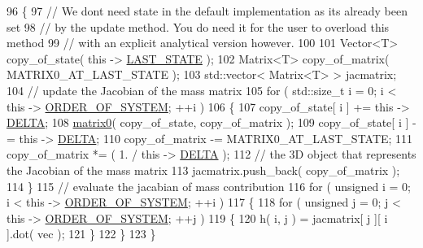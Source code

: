 \begin{DoxyCode}
96  \{
97    \textcolor{comment}{// We dont need state in the default implementation as its already been set}
98    \textcolor{comment}{// by the update method. You do need it for the user to overload this method}
99    \textcolor{comment}{// with an explicit analytical version however.}
100 
101    Vector<T> copy\_of\_state( \textcolor{keyword}{this} -> \hyperlink{classLuna_1_1Residual_abcfc99f00aa4cf3616b32dfd5315dece}{LAST\_STATE} );
102    Matrix<T> copy\_of\_matrix( MATRIX0\_AT\_LAST\_STATE );
103    std::vector< Matrix<T> > jacmatrix;
104    \textcolor{comment}{// update the Jacobian of the mass matrix}
105    \textcolor{keywordflow}{for} ( std::size\_t i = 0; i < \textcolor{keyword}{this} -> \hyperlink{classLuna_1_1Residual_a7facf1267eb277d84aeea8beba2cb200}{ORDER\_OF\_SYSTEM}; ++i )
106    \{
107      copy\_of\_state[ i ] += \textcolor{keyword}{this} -> \hyperlink{classLuna_1_1Residual_a1bf38ddfa149797de560dcb11c975fef}{DELTA};
108      \hyperlink{classLuna_1_1Equation__1matrix_a7e0adf303491e67602d5e34ab7ec3ada}{matrix0}( copy\_of\_state, copy\_of\_matrix );
109      copy\_of\_state[ i ] -= \textcolor{keyword}{this} -> \hyperlink{classLuna_1_1Residual_a1bf38ddfa149797de560dcb11c975fef}{DELTA};
110      copy\_of\_matrix -= MATRIX0\_AT\_LAST\_STATE;
111      copy\_of\_matrix *= ( 1. / \textcolor{keyword}{this} -> \hyperlink{classLuna_1_1Residual_a1bf38ddfa149797de560dcb11c975fef}{DELTA} );
112      \textcolor{comment}{// the 3D object that represents the Jacobian of the mass matrix}
113      jacmatrix.push\_back( copy\_of\_matrix );
114    \}
115    \textcolor{comment}{// evaluate the jacabian of mass contribution}
116    \textcolor{keywordflow}{for} ( \textcolor{keywordtype}{unsigned} i = 0; i < \textcolor{keyword}{this} -> \hyperlink{classLuna_1_1Residual_a7facf1267eb277d84aeea8beba2cb200}{ORDER\_OF\_SYSTEM}; ++i )
117    \{
118      \textcolor{keywordflow}{for} ( \textcolor{keywordtype}{unsigned} j = 0; j < \textcolor{keyword}{this} -> \hyperlink{classLuna_1_1Residual_a7facf1267eb277d84aeea8beba2cb200}{ORDER\_OF\_SYSTEM}; ++j )
119      \{
120        h( i, j ) = jacmatrix[ j ][ i ].dot( vec );
121      \}
122    \}
123  \}
\end{DoxyCode}
\mbox{\label{classLuna_1_1Equation__1matrix_a7e0adf303491e67602d5e34ab7ec3ada}} 
